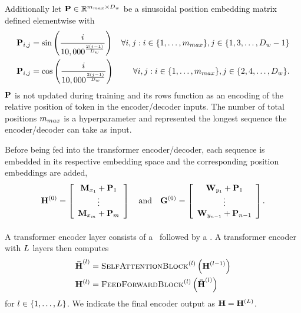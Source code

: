   Additionally let $\mathbf{P} \in \mathbb{R}^{m_{max} \times D_{w}}$ be a sinusoidal position embedding matrix
  defined elementwise with 
 \begin{align*}
     \mathbf{P}_{i,j} & = \sin\left(\frac{i}{10,000^{ \frac{2(j-1)}{D_{w}} }}\right) & \forall i,j : i \in \{1,\ldots,m_{max}\}, j \in \{1,3,\ldots, D_{w} - 1\} \\
     \mathbf{P}_{i,j} & = \cos\left(\frac{i}{10,000^{ \frac{2(j-1)}{D_{w}} }}\right) & \forall i,j : i \in \{1,\ldots, m_{max}\}, j \in \{2,4,\ldots,D_{w}\}. 
  \end{align*} $\mathbf{P}$ is not updated during training and its rows
  function as an encoding of the relative position of token in the encoder/decoder inputs. The number of total positions $m_{max}$ is a hyperparameter
  and represented the longest sequence the encoder/decoder can take as input.

Before being fed into the transformer encoder/decoder, each sequence is 
embedded in its respective embedding space and the corresponding
position embeddings are added,
\[\mathbf{H}^{(0)} = \left[ \begin{array}{c}\mathbf{M}_{x_1} + \mathbf{P}_1\\
\vdots \\ \mathbf{M}_{x_{m}} + \mathbf{P}_{m} \end{array}\right] 
\quad \textrm{and} \quad 
\mathbf{G}^{(0)} = \left[ \begin{array}{c}\mathbf{W}_{y_1} + \mathbf{P}_1\\
\vdots \\ \mathbf{W}_{y_{n-1}} + \mathbf{P}_{n-1} \end{array}\right].
\]

\paragraph{}
A transformer encoder layer consists of a \selfattentionblock~followed
    by a \feedforwardblock.
 A transformer encoder with $L$ layers
    then computes
\begin{align*} 
    {\boldsymbol{\bar{\mathbf{H}}}^{(l)}} & = \textsc{SelfAttentionBlock}^{(l)}
\left(\mathbf{H}^{(l-1)}\right) \\
    \mathbf{H}^{(l)} & = \textsc{FeedForwardBlock}^{(l)}\left({\boldsymbol{\bar{\mathbf{H}}}^{(l)}}\right)
\end{align*} for $l \in \{1,\ldots,L\}$.
We indicate the final encoder output as $\mathbf{H} =  \mathbf{H}^{(L)}$.
 

